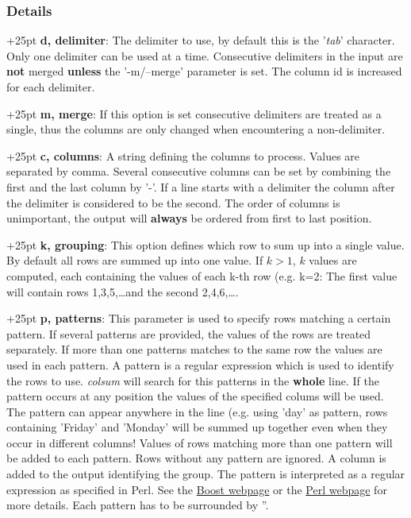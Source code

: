\documentclass[a4paper,10pt,parskip=half]{scrreprt}
\begin{document}
\subsubsection{Details}

\hangindent+25pt 
\textbf{d, delimiter}: The delimiter to use, by default this is the '\textit{tab}' character. Only one delimiter can be used at a time. Consecutive delimiters in the input are \textbf{not} merged \textbf{unless} the '-m/--merge' parameter is set. The column id is increased for each delimiter.

\hangindent+25pt 
\textbf{m, merge}: If this option is set consecutive delimiters are treated as a single, thus the columns are only changed when encountering a non-delimiter.

\hangindent+25pt 
\textbf{c, columns}: A string defining the columns to process. Values are separated by comma. Several consecutive columns can be set by combining the first and the last column by '-'. If a line starts with a delimiter the column after the delimiter is considered to be the second. The order of columns is unimportant, the output will \textbf{always} be ordered from first to last position.

\hangindent+25pt 
\textbf{k, grouping}: This option defines which row to sum up into a single value. By default all rows are summed up into one value. If $k>1$, $k$ values are computed, each containing the values of each k-th row (e.g. k=2: The first value will contain rows 1,3,5,\dots and the second 2,4,6,\dots.

\hangindent+25pt 
\textbf{p, patterns}: This parameter is used to specify rows matching a certain pattern. If several patterns are provided, the values of the rows are treated separately. If more than one patterns matches to the same row the values are used in each pattern. A pattern is a regular expression which is used to identify the rows to use. \textit{colsum} will search for this patterns in the \textbf{whole} line. If the pattern occurs at any position the values of the specified colums will be used. The pattern can appear anywhere in the line (e.g. using 'day' as pattern, rows containing 'Friday' and 'Monday' will be summed up together even when they occur in different columns! Values of rows matching more than one pattern will be added to each pattern. Rows without any pattern are ignored. A column is added to the output identifying the group. The pattern is interpreted as a regular expression as specified in Perl. See the  \href{http://www.boost.org/doc/libs/1_53_0/libs/regex/doc/html/boost_regex/syntax/perl_syntax.
html}{Boost webpage} or the \href{http://perldoc.perl.org/perlre.html#Regular-Expressions}{Perl webpage} for more details. Each pattern has to be surrounded by ''.
\end{document}
